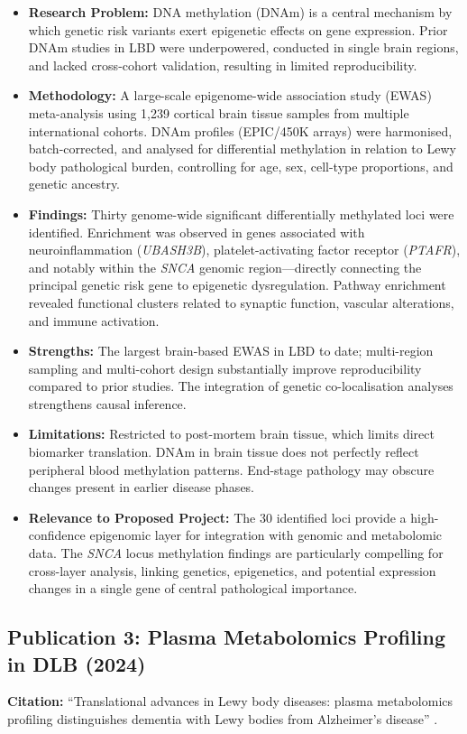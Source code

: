 \begin{itemize}
    \item \textbf{Research Problem:} DNA methylation (DNAm) is a central mechanism by which genetic risk variants exert epigenetic effects on gene expression. Prior DNAm studies in LBD were underpowered, conducted in single brain regions, and lacked cross-cohort validation, resulting in limited reproducibility.
    \item \textbf{Methodology:} A large-scale epigenome-wide association study (EWAS) meta-analysis using 1,239 cortical brain tissue samples from multiple international cohorts. DNAm profiles (EPIC/450K arrays) were harmonised, batch-corrected, and analysed for differential methylation in relation to Lewy body pathological burden, controlling for age, sex, cell-type proportions, and genetic ancestry.
    \item \textbf{Findings:} Thirty genome-wide significant differentially methylated loci were identified. Enrichment was observed in genes associated with neuroinflammation (\textit{UBASH3B}), platelet-activating factor receptor (\textit{PTAFR}), and notably within the \textit{SNCA} genomic region---directly connecting the principal genetic risk gene to epigenetic dysregulation. Pathway enrichment revealed functional clusters related to synaptic function, vascular alterations, and immune activation.
    \item \textbf{Strengths:} The largest brain-based EWAS in LBD to date; multi-region sampling and multi-cohort design substantially improve reproducibility compared to prior studies. The integration of genetic co-localisation analyses strengthens causal inference.
    \item \textbf{Limitations:} Restricted to post-mortem brain tissue, which limits direct biomarker translation. DNAm in brain tissue does not perfectly reflect peripheral blood methylation patterns. End-stage pathology may obscure changes present in earlier disease phases.
    \item \textbf{Relevance to Proposed Project:} The 30 identified loci provide a high-confidence epigenomic layer for integration with genomic and metabolomic data. The \textit{SNCA} locus methylation findings are particularly compelling for cross-layer analysis, linking genetics, epigenetics, and potential expression changes in a single gene of central pathological importance.
\end{itemize}

\subsection{Publication 3: Plasma Metabolomics Profiling in DLB (2024)}
\textbf{Citation:} ``Translational advances in Lewy body diseases: plasma metabolomics profiling distinguishes dementia with Lewy bodies from Alzheimer's disease'' \cite{frontiers2024metabolomics}.

